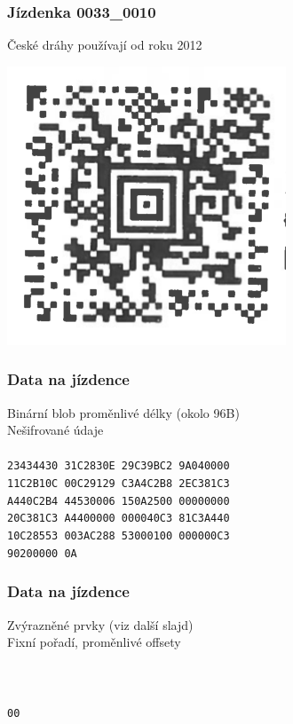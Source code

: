 \documentclass{beamer}
\begin{document}
\begin{frame}
	\frametitle{Jízdenka 0033\_0010}
	\color{black}
	České dráhy používají od roku 2012\\
	\begin{center}
		\includegraphics[scale=2]{./images/aztec/0033_0010.png}
	\end{center}
\end{frame}

\begin{frame}
	\frametitle{Data na jízdence}
	\color{black}
	Binární blob proměnlivé délky (okolo 96B)\\
	Nešifrované údaje\\
	\texttt{\ }\\
	\texttt{23434430 31C2830E 29C39BC2 9A040000\\
	        11C2B10C 00C29129 C3A4C2B8 2EC381C3\\
	        A440C2B4 44530006 150A2500 00000000\\
	        20C381C3 A4400000 000040C3 81C3A440\\
	        10C28553 003AC288 53000100 000000C3\\
	        90200000 0A}
\end{frame}

\begin{frame}
	\frametitle{Data na jízdence}
	\color{black}
	Zvýrazněné prvky (viz další slajd)\\
	Fixní pořadí, proměnlivé offsety\\
	\texttt{\ }\\
	\texttt{\color{red}{23434430 31}\color{black}{C2830E 29C39BC2} \color{cyan}{9A040000}\\
	        \color{black}{11C2B10C 00C29129 C3A4C2B8 2E}\color{orange}{C381}\color{blue}{C3\\
	        A440}\color{green}{C2B4 4453}\color{black}{0006 150A2500 00000000\\
	        20}\color{orange}{C381}\color{blue}{C3 A440}\color{black}{0000 000040}\color{orange}{C3 81}\color{blue}{C3A440}\\
	        \color{magenta}{10C28553}	\color{black} 00\color{olive}{3AC288 53}\color{black}{000100 000000C3\\
	        90200000 0A}}
\end{frame}
\end{document}
